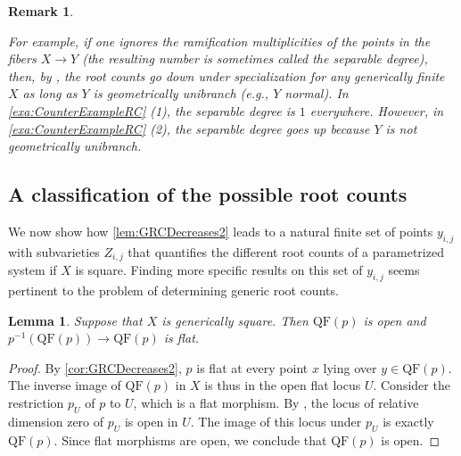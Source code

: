 \documentclass[12pt,reqno,a4paper]{amsart}
\theoremstyle{theoremstyle}
\newtheorem{lemma}[theorem]{Lemma}
\theoremstyle{examplestyle}
\newtheorem{remark}[theorem]{Remark}
\theoremstyle{algorithmstyle}
\begin{document}
\begin{remark}
\begin{enumerate}[leftmargin=*]
    For example, if one ignores the ramification multiplicities of the points in the fibers $X\to Y$ (the resulting number is sometimes called the \emph{separable degree}), then, by \cite[Th\'{e}or\`{e}me 18.10.16]{EGA44}, the root counts go down under specialization for any generically finite $X$ as long as $Y$ is geometrically unibranch \cite[\href{https://stacks.math.columbia.edu/tag/0BQ2}{Definition 0BQ2}]{stacks-project} (e.g., $Y$ normal).  In \cref{exa:CounterExampleRC} (1), the separable degree is $1$ everywhere. However, in \cref{exa:CounterExampleRC} (2), the separable degree goes up because $Y$ is not geometrically unibranch.
  \end{enumerate}
\end{remark}

\subsection{A classification of the possible root counts}\label{sec:degeneracyGraph}
We now show how \cref{lem:GRCDecreases2} leads to a natural finite set of points $y_{i,j}$ with subvarieties $Z_{i,j}$ that %
quantifies the different root counts of a parametrized system if $X$ is square.  Finding more specific results on this set of $y_{i,j}$ %
seems pertinent to the problem of determining generic root counts.

\begin{lemma}\label{lem:QuasiFiniteLocusOpen}
  Suppose that $X$ is generically square. Then $\mathrm{QF}(p)$ is open and $p^{-1}(\mathrm{QF}(p))\to \mathrm{QF}(p)$ is flat.
\end{lemma}
\begin{proof}
  By \cref{cor:GRCDecreases2}, $p$ is %
  flat at every point $x$ lying over $y\in{\mathrm{QF}(p)}$. %
  The inverse image of $\mathrm{QF}(p)$ in $X$ is thus in the open flat locus $U$. Consider the restriction $p_{U}$ of $p$ to $U$, which is a flat morphism. By \cite[\href{https://stacks.math.columbia.edu/tag/02NM}{Lemma 02NM}]{stacks-project}, the locus of relative dimension zero of $p_{U}$ is open in $U$.
  The image of this locus under $p_{U}$ is exactly $\mathrm{QF}(p)$. Since flat morphisms are open, we conclude that $\mathrm{QF}(p)$ is open.
\end{proof}
\end{document}
